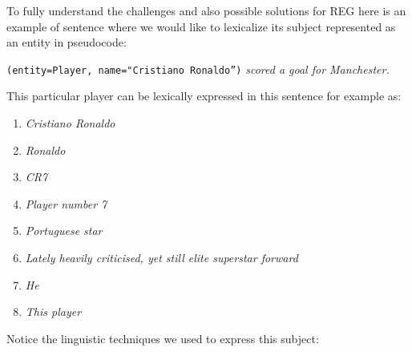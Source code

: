To fully understand the challenges and also possible solutions for REG here is an example of sentence where we would like to lexicalize its subject represented as an entity in pseudocode:
\begin{center}
	\texttt{(entity=Player, name="Cristiano Ronaldo”)} \emph{scored a goal for Manchester.}
\end{center}
This particular player can be lexically expressed in this sentence for example as:
\begin{enumerate}
	\item \emph{Cristiano Ronaldo} \label{reg-1}
	\item \emph{Ronaldo} \label{reg-2}
	\item \emph{CR7} \label{reg-3}
	\item \emph{Player number 7} \label{reg-4}
	\item \emph{Portuguese star} \label{reg-5}
	\item \emph{Lately heavily criticised, yet still elite superstar forward} \label{reg-6}
	\item \emph{He} \label{reg-7}
	\item \emph{This player} \label{reg-8}
	
\end{enumerate}
Notice the linguistic techniques we used to express this subject:
